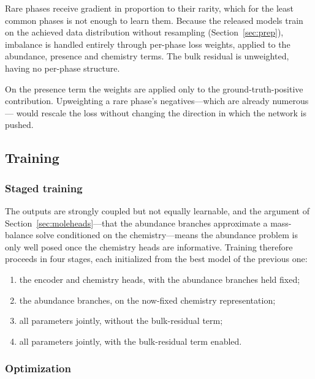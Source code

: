 Rare phases receive gradient in proportion to their rarity, which for the least
common phases is not enough to learn them. Because the released models train on the
achieved data distribution without resampling (Section~\ref{sec:prep}), imbalance is
handled entirely through per-phase loss weights, applied to the abundance, presence
and chemistry terms. The bulk residual is unweighted, having no per-phase structure.

On the presence term the weights are applied only to the ground-truth-positive
contribution. Upweighting a rare phase's negatives---which are already numerous---
would rescale the loss without changing the direction in which the network is pushed.


\subsection{Training}
\label{sec:training}

\subsubsection{Staged training}

The outputs are strongly coupled but not equally learnable, and the argument of
Section~\ref{sec:moleheads}---that the abundance branches approximate a mass-balance
solve conditioned on the chemistry---means the abundance problem is only well posed
once the chemistry heads are informative. Training therefore proceeds in four stages,
each initialized from the best model of the previous one:

\begin{enumerate}
  \item the encoder and chemistry heads, with the abundance branches held fixed;
  \item the abundance branches, on the now-fixed chemistry representation;
  \item all parameters jointly, without the bulk-residual term;
  \item all parameters jointly, with the bulk-residual term enabled.
\end{enumerate}

\subsubsection{Optimization}

